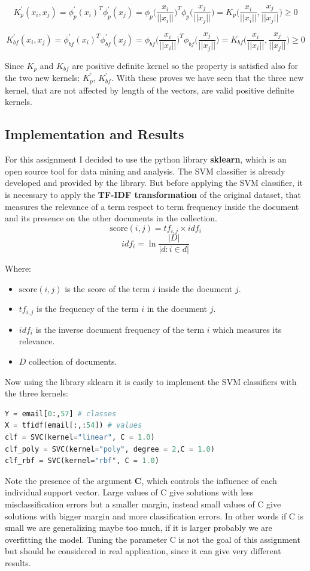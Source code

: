 \documentclass[11pt,a4paper]{article}
\begin{document}
$$K_{p}^\prime(x_i,x_j) =  \phi_{p}^\prime(x_i)^T\phi_{p}^\prime(x_j) = \phi_{p}\Big(\frac{x_i}{||x_i||}\Big)^T\phi_{p}\Big(\frac{x_j}{||x_j||}\Big) = K_{p}\Big(\frac{x_i}{||x_i||},\frac{x_j}{||x_j||}\Big)\geq 0$$

$$K_{bf}^\prime(x_i,x_j) =  \phi_{bf}^\prime(x_i)^T\phi_{bf}^\prime(x_j) = \phi_{bf}\Big(\frac{x_i}{||x_i||}\Big)^T\phi_{bf}\Big(\frac{x_j}{||x_j||}\Big) = K_{bf}\Big(\frac{x_i}{||x_i||},\frac{x_j}{||x_j||}\Big)\geq 0$$

Since $K_{p}$ and $K_{bf}$ are positive definite kernel so the property is satisfied also for the two new kernels: $K_{p}^\prime$, $K_{bf}^\prime$. With these proves we have seen that the three new kernel, that are not affected by length of the vectors, are valid positive definite kernels.


\subsection{Implementation and Results}
For this assignment I decided to use the python library \textbf{sklearn}, which is an open source tool for data mining and analysis. The SVM classifier is already developed and provided by the library. But before applying the SVM classifier, it is necessary to apply the \textbf{TF-IDF transformation} of the original dataset, that measures the relevance of a term respect to term frequency inside the document and its presence on the other documents in the collection.
$$\text{score}(i,j) = tf_{i,j}\times idf_i$$
$$idf_i = \ln \frac{|D|}{|d: i \in d|}$$

Where:
\begin{itemize}
	\item $\text{score}(i,j)$ is the score of the term $i$ inside the document $j$.
	\item $tf_{i,j}$ is the frequency of the term $i$ in the document $j$.
	\item $idf_i$ is the inverse document frequency of the term $i$ which measures its relevance.
	\item $D$ collection of documents.
\end{itemize}
Now using the library sklearn it is easily to implement the SVM classifiers with the three kernels:
\begin{lstlisting}[language=Python]
Y = email[0:,57] # classes
X = tfidf(email[:,:54]) # values
clf = SVC(kernel="linear", C = 1.0)
clf_poly = SVC(kernel="poly", degree = 2,C = 1.0)
clf_rbf = SVC(kernel="rbf", C = 1.0)
\end{lstlisting}
Note the presence of the argument \textbf{C}, which controls the influence of each individual support vector. Large values of C give solutions with less misclassification errors but a smaller margin, instead small values of C give solutions with bigger margin and more classification errors. In other words if C is small we are generalizing maybe too much, if it is larger probably we are overfitting the model.  Tuning the parameter C is not the goal of this assignment but should be considered in real application, since it can give very different results.\\
\end{document}
